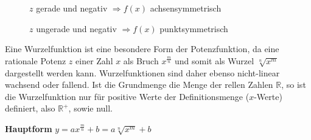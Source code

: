 \begin{figure}[h!]
\begin{floatrow}
{
		} {\caption*{$z$ gerade und negativ $\Rightarrow f(x)$ achsensymmetrisch}}

		\ffigbox
		{
		} {\caption*{$z$ ungerade und negativ $\Rightarrow f(x)$ punktsymmetrisch}}
	\end{floatrow}
\end{figure}

\pagebreak


Eine Wurzelfunktion ist eine besondere Form der Potenzfunktion, da eine rationale Potenz $z$ einer Zahl $x$ als Bruch $x^{\frac{m}{n}}$ und somit als Wurzel $\sqrt[n]{x^m}$ dargestellt werden kann. Wurzelfunktionen sind daher ebenso nicht-linear wachsend oder fallend. Ist die Grundmenge die Menge der rellen Zahlen $\mathbb{R}$, so ist die Wurzelfunktion nur f\"{u}r positive Werte der Definitionsmenge ($x$-Werte) definiert, also $\mathbb{R^+}$, sowie null.

\textbf{Hauptform}  $y = ax^{\frac{m}{n}} + b = a\sqrt[n]{x^m} + b$

